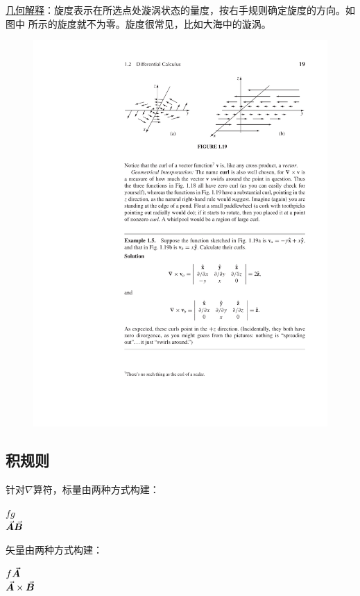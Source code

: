 \uline{几何解释}：旋度表示在所选点处漩涡状态的量度，按右手规则确定旋度的方向。如图中
所示的旋度就不为零。旋度很常见，比如大海中的漩涡。
\begin{figure}[ht]
    \centering
    \setlength{\abovecaptionskip}{0.2cm}
    \includegraphics[scale=1.3]{./figure/math/vec-curl.pdf}
    \caption{}
    \label{fig:vec-curl}
\end{figure}

\subsection{积规则}
针对$\nabla$算符，标量由两种方式构建：
\begin{center}
    $fg$ \\
    $\vec{\bm{A}}\vec{\bm{B}}$
\end{center}
矢量由两种方式构建：
\begin{center}
    $f\vec{\bm{A}}$ \\
    $\vec{\bm{A}} \times \vec{\bm{B}}$
\end{center}

